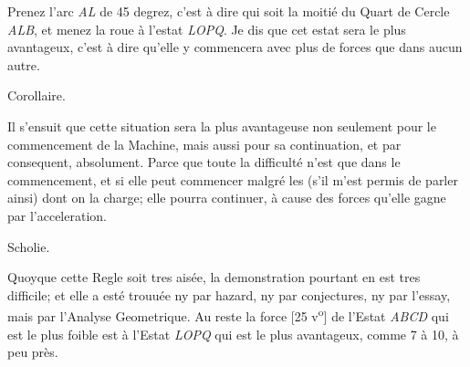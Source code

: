  \vspace{1em}  \pend \pstart  Prenez l'arc \textit{AL} de 45 degrez, c'est \`{a} dire qui  soit la moiti\'{e} du Quart de Cercle \textit{ALB}, et menez la  roue \`{a} l'estat \textit{LOPQ}. Je dis que cet estat  sera le plus avantageux, c'est \`{a} dire qu'elle y commencera  avec plus de forces que dans aucun autre. \pend \pstart  \vspace{1em} \begin{center} Corollaire. \end{center} \pend \pstart  \vspace{1em} Il s'ensuit que cette situation  sera la plus avantageuse non seulement  pour le commencement de la Machine, mais aussi pour sa  continuation, et par consequent, absolument. Parce que toute  la difficult\'{e} n'est que dans le commencement, et si elle peut commencer  malgr\'{e} les  (s'il m'est permis de parler ainsi)  dont on la charge;  elle pourra continuer, \`{a} cause des forces  qu'elle gagne par l'acceleration. \pend \pstart  \vspace{1em} \begin{center} Scholie. \end{center} \pend \pstart  \vspace{1em} Quoyque cette Regle soit tres ais\'{e}e, la demonstration pourtant en est  tres difficile; et elle a est\'{e} trouu\'{e}e ny par hazard, ny par conjectures, ny par l'essay, mais par l'Analyse Geometrique.\protect{} Au reste la force [25 v\textsuperscript{o}] de l'Estat \textit{ABCD} qui est le plus foible est  \`{a} l'Estat \textit{LOPQ} qui est le plus avantageux, comme 7 \`{a} 10,  \`{a} peu pr\`{e}s. \pend

 
 


 


 


 



 


 


 


 


 


 


 


 


 


 

